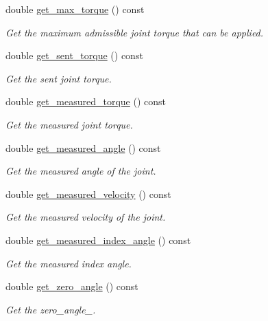 \begin{DoxyCompactItemize}
double \hyperlink{classblmc__robots_1_1BlmcJointModule_a53be7ff5c2b54c15813a68116e85747e}{get\+\_\+max\+\_\+torque} () const
\begin{DoxyCompactList}\small\item\em Get the maximum admissible joint torque that can be applied. \end{DoxyCompactList}\item 
double \hyperlink{classblmc__robots_1_1BlmcJointModule_af3f19ffc942e9b49dce892b207d3d476}{get\+\_\+sent\+\_\+torque} () const
\begin{DoxyCompactList}\small\item\em Get the sent joint torque. \end{DoxyCompactList}\item 
double \hyperlink{classblmc__robots_1_1BlmcJointModule_abb57fdffcc0222b192658239ef45ab63}{get\+\_\+measured\+\_\+torque} () const
\begin{DoxyCompactList}\small\item\em Get the measured joint torque. \end{DoxyCompactList}\item 
double \hyperlink{classblmc__robots_1_1BlmcJointModule_a8c6419cfb80eb5986dffd982df18a817}{get\+\_\+measured\+\_\+angle} () const
\begin{DoxyCompactList}\small\item\em Get the measured angle of the joint. \end{DoxyCompactList}\item 
double \hyperlink{classblmc__robots_1_1BlmcJointModule_a6db4f8c98e9a3e931b19a98dc1339e27}{get\+\_\+measured\+\_\+velocity} () const
\begin{DoxyCompactList}\small\item\em Get the measured velocity of the joint. \end{DoxyCompactList}\item 
double \hyperlink{classblmc__robots_1_1BlmcJointModule_a47b6a71bb9c300d2398924403a6e7e3c}{get\+\_\+measured\+\_\+index\+\_\+angle} () const
\begin{DoxyCompactList}\small\item\em Get the measured index angle. \end{DoxyCompactList}\item 
double \hyperlink{classblmc__robots_1_1BlmcJointModule_ad6fab5bc289e01a34374ea8031f5383e}{get\+\_\+zero\+\_\+angle} () const
\begin{DoxyCompactList}\small\item\em Get the zero\+\_\+angle\+\_\+. \end{DoxyCompactList}\item 

\end{DoxyCompactItemize}
